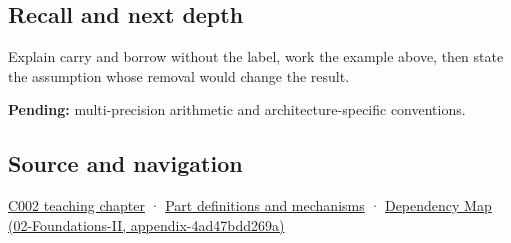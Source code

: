 \subsection{Recall and next depth}\label{appendix-d52d5f78ffd1-recall-and-next-depth}

Explain carry and borrow without the label, work the example above, then state the assumption whose removal would change the result.

\textbf{Pending:} multi-precision arithmetic and architecture-specific conventions.

\subsection{Source and navigation}\label{appendix-d52d5f78ffd1-source-and-navigation}

\hyperref[01-foundations-i-ch001-arithmetic-becomes-a-policy]{C002 teaching chapter} · \hyperref[appendix-fd090d982a15]{Part definitions and mechanisms} · \href{../02-Foundations-II/main.pdf\#nameddest=appendix-4ad47bdd269a}{Dependency Map (02-Foundations-II, appendix-4ad47bdd269a)}

